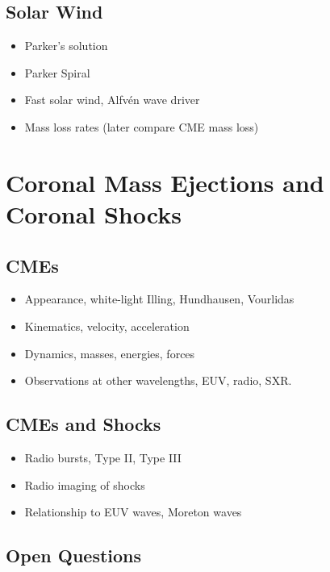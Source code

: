 \subsection{Solar Wind}\label{sec:13}

\begin{itemize}
\item Parker's solution
\item Parker Spiral
\item Fast solar wind, Alfv\'{e}n wave driver
\item Mass loss rates (later compare CME mass loss)
\end{itemize}



\section{Coronal Mass Ejections and Coronal Shocks}\label{sec:2}

\subsection{CMEs}\label{sec:20}

\begin{itemize}
\item Appearance, white-light Illing, Hundhausen, Vourlidas
\item Kinematics, velocity, acceleration
\item Dynamics, masses, energies, forces
\item Observations at other wavelengths, EUV, radio, SXR.
\end{itemize}

\subsection{CMEs and Shocks}\label{sec:21}

\begin{itemize}
\item Radio bursts, Type II, Type III
\item Radio imaging of shocks
\item Relationship to EUV waves, Moreton waves
\end{itemize}

\subsection{Open Questions}\label{sec:22}






